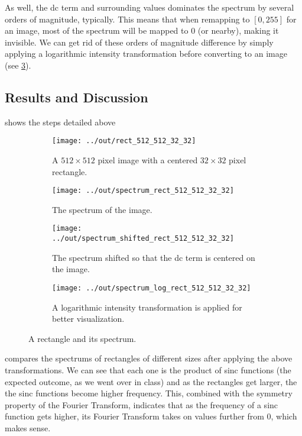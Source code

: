 \documentclass[headings=optiontoheadandtoc,listof=totoc,parskip=full]{scrartcl}
\begin{document}
As well, the dc term and surrounding values dominates the spectrum by several orders of magnitude, typically. This means that when remapping to $[0, 255]$ for an image, most of the spectrum will be mapped to 0 (or nearby), making it invisible. We can get rid of these orders of magnitude difference by simply applying a logarithmic intensity transformation before converting to an image (see \cref{fig:spectrum-log}).

\subsection{Results and Discussion}

 shows the steps detailed above 

\begin{figure}[H]
	\centering
	\begin{subfigure}[t]{.22\textwidth}
		\centering
		\texttt{[image: ../out/rect\_512\_512\_32\_32]}
		\caption{A $512 \times 512$ pixel image with a centered $32 \times 32$ pixel rectangle.}
	\end{subfigure}
	\quad
	\begin{subfigure}[t]{.22\textwidth}
		\centering
		\texttt{[image: ../out/spectrum\_rect\_512\_512\_32\_32]}
		\caption{The spectrum of the image.}
		\label{fig:spectrum-unshifted}
	\end{subfigure}
	\quad
	\begin{subfigure}[t]{.22\textwidth}
		\centering
		\texttt{[image: ../out/spectrum\_shifted\_rect\_512\_512\_32\_32]}
		\caption{The spectrum shifted so that the dc term is centered on the image.}
		\label{fig:spectrum-shifted}
	\end{subfigure}
	\quad
	\begin{subfigure}[t]{.22\textwidth}
		\centering
		\texttt{[image: ../out/spectrum\_log\_rect\_512\_512\_32\_32]}
		\caption{A logarithmic intensity transformation is applied for better visualization.}
		\label{fig:spectrum-log}
	\end{subfigure}
	\caption{A rectangle and its spectrum.}
	\label{fig:rectangle-spectrum-steps}
\end{figure}

 compares the spectrums of rectangles of different sizes after applying the above transformations. We can see that each one is the product of sinc functions (the expected outcome, as we went over in class) and as the rectangles get larger, the the sinc functions become higher frequency. This, combined with the symmetry property of the Fourier Transform, indicates that as the frequency of a sinc function gets higher, its Fourier Transform takes on values further from 0, which makes sense.
\end{document}
